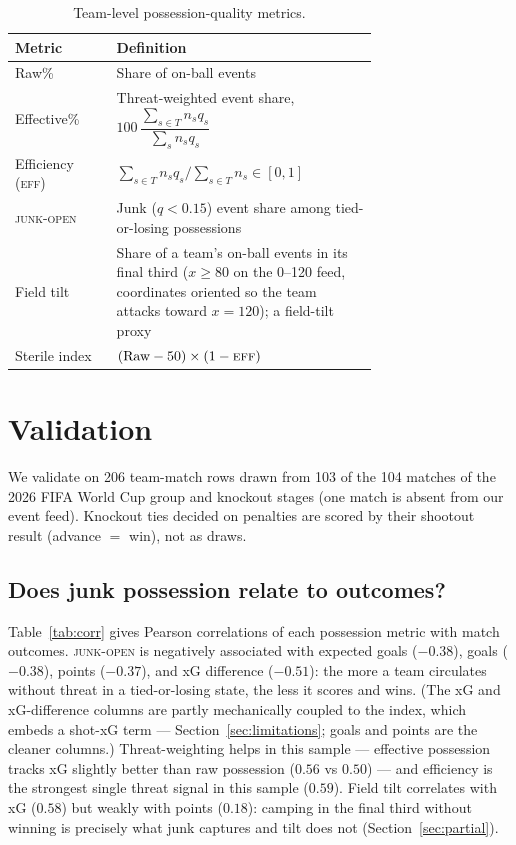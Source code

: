 \documentclass[11pt]{article}
\newcommand{\junk}{\textsc{junk-open}}
\newcommand{\eff}{\textsc{eff}}
\begin{document}
\begin{table}[t]
\centering
\small
\begin{tabular}{lp{0.72\linewidth}}
\toprule
Metric & Definition \\
\midrule
Raw\% & Share of on-ball events \\
Effective\% & Threat-weighted event share, $100\,\dfrac{\sum_{s\in T} n_s q_s}{\sum_{s} n_s q_s}$ \\
Efficiency (\eff) & $\sum_{s\in T} n_s q_s / \sum_{s\in T} n_s \in [0,1]$ \\
\junk{} & Junk ($q<0.15$) event share among tied-or-losing possessions \\
Field tilt & Share of a team's on-ball events in its final third ($x\ge80$ on the 0--120 feed, coordinates oriented so the team attacks toward $x=120$); a field-tilt proxy \\
Sterile index & $(\text{Raw}-50)\times(1-\eff)$ \\
\bottomrule
\end{tabular}
\caption{Team-level possession-quality metrics.}
\label{tab:metrics}
\end{table}

\section{Validation}
\label{sec:validation}

We validate on 206 team-match rows drawn from 103 of the 104 matches of the 2026
FIFA World Cup group and knockout stages (one match is absent from our event
feed). Knockout ties decided on penalties are scored by their shootout result
(advance $=$ win), not as draws.

\subsection{Does junk possession relate to outcomes?}
\label{sec:corr}

Table~\ref{tab:corr} gives Pearson correlations of each possession metric with
match outcomes. \junk{} is negatively associated with expected goals
($-0.38$), goals ($-0.38$), points ($-0.37$), and xG difference ($-0.51$):
the more a team circulates without threat in a tied-or-losing state, the less
it scores and wins. (The xG and xG-difference columns are partly
mechanically coupled to the index, which embeds a shot-xG term ---
Section~\ref{sec:limitations}; goals and points are the cleaner columns.) Threat-weighting helps in this sample --- effective
possession tracks xG slightly better than raw possession ($0.56$ vs $0.50$) --- and efficiency is
the strongest single threat signal in this sample ($0.59$). Field tilt
correlates with xG ($0.58$) but weakly with points ($0.18$): camping in the final third without winning is precisely
what junk captures and tilt does not (Section~\ref{sec:partial}).
\end{document}
